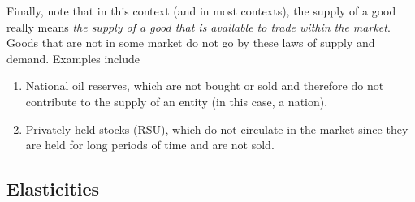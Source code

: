 \documentclass{article}
\begin{document}
    Finally, note that in this context (and in most contexts), the supply of a good really means \textit{the supply of a good that is available to trade within the market}. Goods that are not in some market do not go by these laws of supply and demand. Examples include
    \begin{enumerate}
      \item National oil reserves, which are not bought or sold and therefore do not contribute to the supply of an entity (in this case, a nation).
      \item Privately held stocks (RSU), which do not circulate in the market since they are held for long periods of time and are not sold.
    \end{enumerate}

  \subsection{Elasticities}
\end{document}
